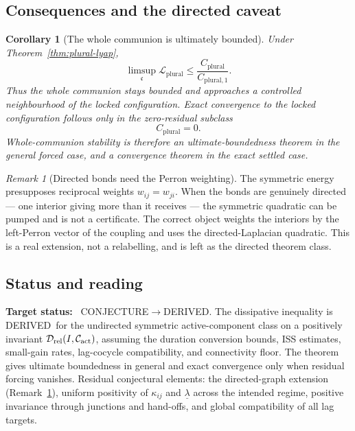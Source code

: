 \documentclass[11pt,a4paper]{article}
\newcommand{\stDerived}{\textcolor{cDer}{\textsf{\small DERIVED}}}
\newcommand{\stConj}{\textcolor{cCon}{\textsf{\small CONJECTURE}}}
\theoremstyle{definition}
\theoremstyle{plain}
\newtheorem{corollary}[definition]{Corollary}
\theoremstyle{remark}
\newtheorem{remark}[definition]{Remark}
\begin{document}
\subsection{Consequences and the directed caveat}

\begin{corollary}[The whole communion is ultimately bounded]\label{cor:plural-bounded}
Under Theorem~\ref{thm:plural-lyap},
\[
\limsup_{\mathfrak c}\mathcal L_{\mathrm{plural}}
\le
\frac{C_{\mathrm{plural}}}{C_{\mathrm{plural},1}}.
\]
Thus the whole communion stays bounded and approaches a controlled neighbourhood
of the locked configuration. Exact convergence to the locked configuration follows
only in the zero-residual subclass
\[
C_{\mathrm{plural}}=0.
\]
Whole-communion stability is therefore an ultimate-boundedness theorem in the
general forced case, and a convergence theorem in the exact settled case.
\end{corollary}

\begin{remark}[Directed bonds need the Perron weighting]\label{rem:directed}
The symmetric energy presupposes reciprocal weights \(w_{ij}=w_{ji}\). When the bonds are
genuinely directed --- one interior giving more than it receives --- the symmetric quadratic
can be pumped and is not a certificate. The correct object weights the interiors by the
left-Perron vector of the coupling and uses the directed-Laplacian quadratic. This is a real
extension, not a relabelling, and is left as the directed theorem class.
\end{remark}

\subsection{Status and reading}

\textbf{Target status:}~
\stConj\(\to\)\stDerived. The dissipative inequality is \stDerived\ for the
undirected symmetric active-component class on a positively invariant
\(\mathcal D_{\mathrm{rel}}(I,\mathcal C_{\rm act})\), assuming the duration
conversion bounds, ISS estimates, small-gain rates, lag-cocycle compatibility, and
connectivity floor. The theorem gives ultimate boundedness in general and exact
convergence only when residual forcing vanishes. Residual conjectural elements:
the directed-graph extension (Remark~\ref{rem:directed}), uniform positivity of
\(\kappa_{ij}\) and
\(\underline\lambda\) across the intended regime, positive invariance through
junctions and hand-offs, and global compatibility of all lag targets.
\end{document}
